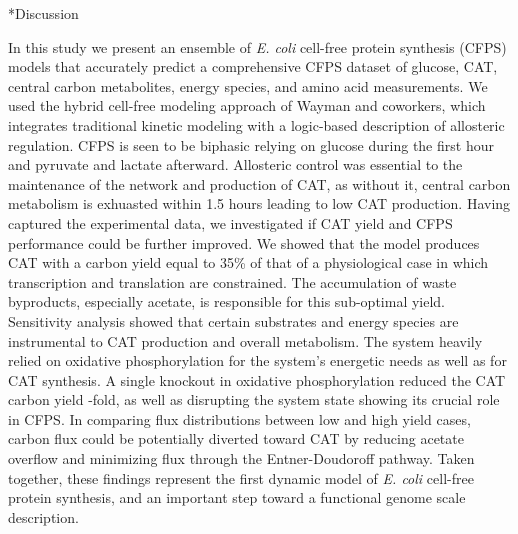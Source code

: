 \documentclass[12pt]{article}
\makeatletter
\renewcommand\section{\@startsection
	{subsection}{2}{0mm}
	{-0.2in}
	{0.05\baselineskip}
	{\normalfont\large\bfseries}}
\makeatother
\begin{document}
\clearpage

\section*{Discussion}


In this study we present an ensemble of \textit{E. coli} cell-free protein synthesis (CFPS) models that accurately predict a comprehensive CFPS dataset of glucose, CAT, central carbon metabolites, energy species, and amino acid measurements.
We used the hybrid cell-free modeling approach of Wayman and coworkers, which integrates traditional kinetic modeling with a logic-based description of allosteric regulation.
CFPS is seen to be biphasic relying on glucose during the first hour and pyruvate and lactate afterward.
Allosteric control was essential to the maintenance of the network and production of CAT, as without it, central carbon metabolism is exhuasted within 1.5 hours leading to low CAT production.
Having captured the experimental data, we investigated if CAT yield and CFPS performance could be further improved.
We showed that the model produces CAT with a carbon yield equal to 35\% of that of a physiological case in which transcription and translation are constrained.
The accumulation of waste byproducts, especially acetate, is responsible for this sub-optimal yield.
Sensitivity analysis showed that certain substrates and energy species are instrumental to CAT production and overall metabolism.
The system heavily relied on oxidative phosphorylation for the system's energetic needs as well as for CAT synthesis.
A single knockout in oxidative phosphorylation reduced the CAT carbon yield -fold, as well as disrupting the system state showing its crucial role in CFPS.
In comparing flux distributions between low and high yield cases, carbon flux could be potentially diverted toward CAT by reducing acetate overflow and minimizing flux through the Entner-Doudoroff pathway.
Taken together, these findings represent the first dynamic model of \textit{E. coli} cell-free protein synthesis, and an important step toward a functional genome scale description.
\end{document}
